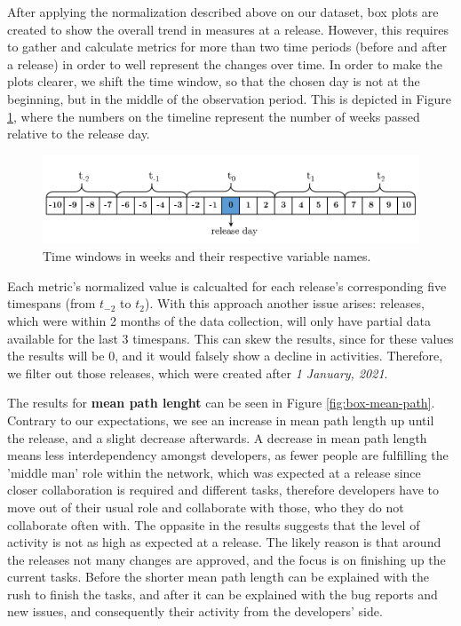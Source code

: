 After applying the normalization described above on our dataset, box plots are created to show the overall trend in measures at a release. However, this requires to gather and calculate metrics for more than two time periods (before and after a release) in order to well represent the changes over time. In order to make the plots clearer, we shift the time window, so that the chosen day is not at the beginning, but in the middle of the observation period. This is depicted in Figure \ref{fig:time-window}, where the numbers on the timeline represent the number of weeks passed relative to the release day.

\begin{figure}
    \centering
    \includegraphics[width=\textwidth]{figures/quantitative/time_window.png}
    \caption{Time windows in weeks and their respective variable names.}
    \label{fig:time-window}
\end{figure}

Each metric's normalized value is calcualted for each release's corresponding five timespans (from $t_{-2}$ to $t_2$). With this approach another issue arises: releases, which were within 2 months of the data collection, will only have partial data available for the last 3 timespans. This can skew the results, since for these values the results will be 0, and it would falsely show a decline in activities. Therefore, we filter out those releases, which were created after \textit{1 January, 2021}.

The results for \textbf{mean path lenght} can be seen in Figure \ref{fig:box-mean-path}. Contrary to our expectations, we see an increase in mean path length up until the release, and a slight decrease afterwards. A decrease in mean path length means less interdependency amongst developers, as fewer people are fulfilling the 'middle man' role within the network, which was expected at a release since closer collaboration is required and different tasks, therefore developers have to move out of their usual role and collaborate with those, who they do not collaborate often with. The oppasite in the results suggests that the level of activity is not as high as expected at a release. The likely reason is that around the releases not many changes are approved, and the focus is on finishing up the current tasks. Before the shorter mean path length can be explained with the rush to finish the tasks, and after it can be explained with the bug reports and new issues, and consequently their activity from the developers' side.

